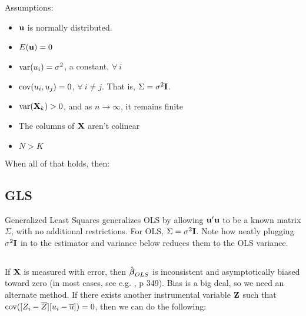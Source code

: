 Assumptions:

\begin{itemize}
\item ${\bf u}$ is normally distributed.
\item $E({\bf u}) = 0$
\item $\hbox{var}(u_i) = \sigma^2$, a constant, $\forall\ i$
\item $\hbox{cov}(u_i, u_j) = 0$, $\forall\ i\neq j$. That is, $\Sigma =
\sigma^2{\bf I}$.
\item $\hbox{var}({\bf X}_k)>0$, and as $n\to\infty$, it remains finite
\item The columns of ${\bf X}$ aren't colinear
\item $N>K$
\end{itemize}

When all of that holds, then:

\subsection{GLS} \label{GLS}
Generalized Least Squares generalizes OLS by allowing ${\bf u}'{\bf u}$ to be a
known matrix $\Sigma$, with no additional restrictions. For OLS,
$\Sigma=\sigma^2{\bf I}$. Note how neatly plugging $\sigma^2{\bf I}$ in to the
estimator and variance below reduces them to the OLS variance.


\subsection{}			\label{IV}

If ${\bf X}$ is measured with error, then $\hat{{\mbox{\boldmath$\beta$}}}_{OLS}$ is inconsistent and
asymptotically biased toward zero (in most cases, see e.g. \cite{kmenta},
p 349). Bias is a big deal, so we need an alternate method. If there exists
another instrumental variable ${\bf Z}$ such that $\hbox{cov}([Z_i-\overline
Z][u_i-\overline u])=0$, then we can do the following:

